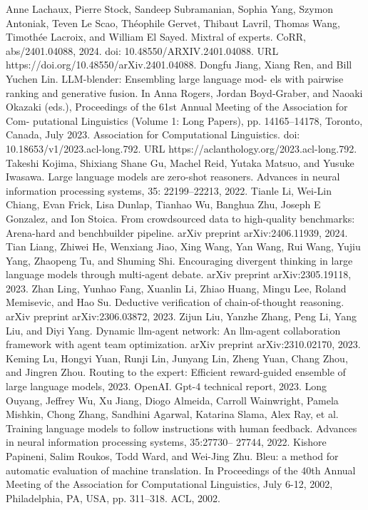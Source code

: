 Anne Lachaux, Pierre Stock, Sandeep Subramanian, Sophia Yang, Szymon Antoniak, Teven Le
Scao, Théophile Gervet, Thibaut Lavril, Thomas Wang, Timothée Lacroix, and William El Sayed.
Mixtral of experts. CoRR, abs/2401.04088, 2024. doi: 10.48550/ARXIV.2401.04088. URL
https://doi.org/10.48550/arXiv.2401.04088.
Dongfu Jiang, Xiang Ren, and Bill Yuchen Lin. LLM-blender: Ensembling large language mod-
els with pairwise ranking and generative fusion. In Anna Rogers, Jordan Boyd-Graber, and
Naoaki Okazaki (eds.), Proceedings of the 61st Annual Meeting of the Association for Com-
putational Linguistics (Volume 1: Long Papers), pp. 14165–14178, Toronto, Canada, July
2023. Association for Computational Linguistics. doi: 10.18653/v1/2023.acl-long.792. URL
https://aclanthology.org/2023.acl-long.792.
Takeshi Kojima, Shixiang Shane Gu, Machel Reid, Yutaka Matsuo, and Yusuke Iwasawa. Large
language models are zero-shot reasoners. Advances in neural information processing systems, 35:
22199–22213, 2022.
Tianle Li, Wei-Lin Chiang, Evan Frick, Lisa Dunlap, Tianhao Wu, Banghua Zhu, Joseph E Gonzalez,
and Ion Stoica. From crowdsourced data to high-quality benchmarks: Arena-hard and benchbuilder
pipeline. arXiv preprint arXiv:2406.11939, 2024.
Tian Liang, Zhiwei He, Wenxiang Jiao, Xing Wang, Yan Wang, Rui Wang, Yujiu Yang, Zhaopeng Tu,
and Shuming Shi. Encouraging divergent thinking in large language models through multi-agent
debate. arXiv preprint arXiv:2305.19118, 2023.
Zhan Ling, Yunhao Fang, Xuanlin Li, Zhiao Huang, Mingu Lee, Roland Memisevic, and Hao Su.
Deductive verification of chain-of-thought reasoning. arXiv preprint arXiv:2306.03872, 2023.
Zijun Liu, Yanzhe Zhang, Peng Li, Yang Liu, and Diyi Yang. Dynamic llm-agent network: An
llm-agent collaboration framework with agent team optimization. arXiv preprint arXiv:2310.02170,
2023.
Keming Lu, Hongyi Yuan, Runji Lin, Junyang Lin, Zheng Yuan, Chang Zhou, and Jingren Zhou.
Routing to the expert: Efficient reward-guided ensemble of large language models, 2023.
OpenAI. Gpt-4 technical report, 2023.
Long Ouyang, Jeffrey Wu, Xu Jiang, Diogo Almeida, Carroll Wainwright, Pamela Mishkin, Chong
Zhang, Sandhini Agarwal, Katarina Slama, Alex Ray, et al. Training language models to follow
instructions with human feedback. Advances in neural information processing systems, 35:27730–
27744, 2022.
Kishore Papineni, Salim Roukos, Todd Ward, and Wei-Jing Zhu. Bleu: a method for automatic
evaluation of machine translation. In Proceedings of the 40th Annual Meeting of the Association
for Computational Linguistics, July 6-12, 2002, Philadelphia, PA, USA, pp. 311–318. ACL, 2002.
